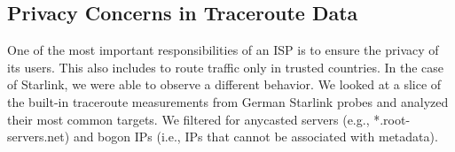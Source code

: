 
\subsection{Privacy Concerns in Traceroute Data}

One of the most important responsibilities of an \ac{ISP} is to ensure the
privacy of its users. This also includes to route traffic only in trusted
countries. In the case of Starlink, we were able to observe a different
behavior. We looked at a slice of the built-in traceroute measurements from
German Starlink probes and analyzed their most common targets. We filtered for
anycasted servers (e.g., *.root-servers.net) and bogon IPs (i.e., IPs that
cannot be associated with metadata).

